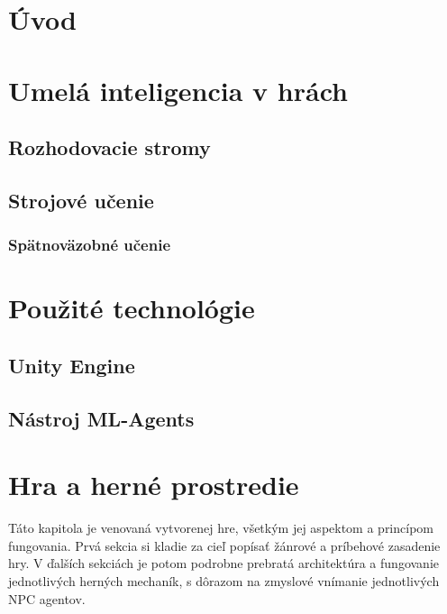 \documentclass[slovak, master]{diploma}
\begin{document}
\MakeTitlePages

\listoffigures
\clearpage

\listoftables
\clearpage

\lstlistoflistings
\clearpage

\chapter{Úvod}
\label{sec:Introduction}


\chapter{Umelá inteligencia v hrách}
\label{sec:AI in games}

\section{Rozhodovacie stromy}
\label{sec:DecisionTreesOverview}

\section{Strojové učenie}
\label{sec:MachineLearningOverview}
\subsection{Spätnoväzobné učenie}
\label{sec:ReinforcemenLearningOverview}


\chapter{Použité technológie}
\label{sec:Tech}
\section{Unity Engine}
\label{sec:Unity}
\section{Nástroj ML-Agents}
\label{sec:ML-Agents}

\chapter{Hra a herné prostredie}
\label{sec:GameOverview}
Táto kapitola je venovaná vytvorenej hre, všetkým jej aspektom a princípom fungovania. Prvá sekcia si kladie za cieľ popísať žánrové a príbehové zasadenie hry. V ďalších sekciách je potom podrobne prebratá architektúra a fungovanie jednotlivých herných mechaník, s dôrazom na zmyslové vnímanie jednotlivých NPC agentov.
\end{document}

